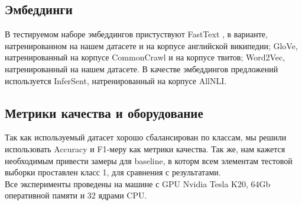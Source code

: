\subsection{Эмбеддинги}
В тестируемом наборе эмбеддингов пристуствуют FastText \cite{fasttext}, в варианте, натренированном на нашем датасете и на корпусе английской википедии; GloVe\cite{glove}, натренированный на корпусе CommonCrawl и на корпусе твитов; Word2Vec\cite{word2vec}, натренированный на нашем датасете. В качестве эмбеддингов предложений используется InferSent\cite{infersent}, натренированный на корпусе AllNLI.

\subsection{Метрики качества и оборудование}
Так как используемый датасет хорошо сбалансирован по классам, мы решили использовать Accuracy и F1-меру как метрики качества. Так же, нам кажется необходимым привести замеры для baseline, в которм всем элементам тестовой выборки проставлен класс 1, для сравнения с результатами.\\
Все эксперименты проведены на машине с GPU Nvidia Tesla K20, 64Gb оперативной памяти и 32 ядрами CPU.




